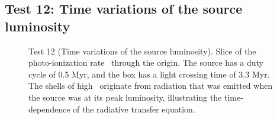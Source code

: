 \documentclass[12pt,preprint]{aastex}
\begin{document}


\subsection{Test 12: Time variations of the source luminosity}

\begin{figure}[t]
  \caption{\label{fig:test12_kph} Test 12 (Time variations of the
    source luminosity).  Slice of the photo-ionization rate
    \kph~through the origin.  The source has a duty cycle of 0.5 Myr,
    and the box has a light crossing time of 3.3 Myr.  The shells of
    high \kph~originate from radiation that was emitted when the
    source was at its peak luminosity, illustrating the
    time-dependence of the radiative transfer equation.}
\end{figure}
\end{document}
